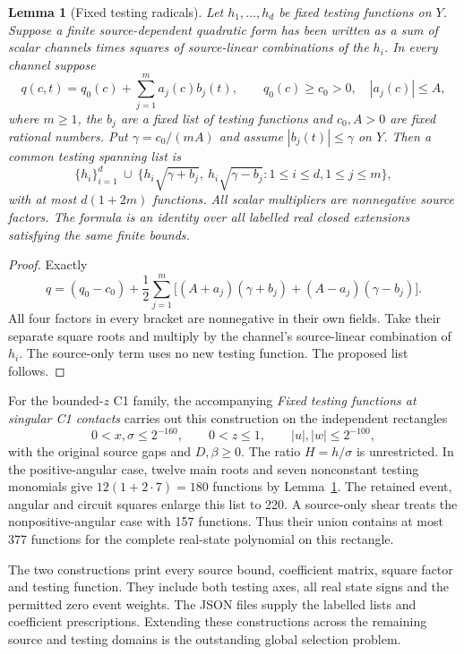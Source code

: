 \documentclass[11pt]{article}
\newtheorem{lemma}[proposition]{Lemma}
\begin{document}
\begin{lemma}[Fixed testing radicals]\label{lem:box}
Let $h_1,\ldots,h_d$ be fixed testing functions on $Y$.
Suppose a finite source-dependent quadratic form has been written
as a sum of scalar channels times squares of source-linear
combinations of the $h_i$. In every channel suppose
\[
 q(c,t)=q_0(c)+\sum_{j=1}^{m}a_j(c)b_j(t),\qquad
 q_0(c)\ge c_0>0,\quad |a_j(c)|\le A,
\]
where $m\ge1$, the $b_j$ are a fixed list of testing functions and
$c_0,A>0$ are fixed rational numbers. Put
$\gamma=c_0/(mA)$ and assume $|b_j(t)|\le\gamma$ on $Y$.
Then a common testing spanning list is
\[
 \{h_i\}_{i=1}^d\ \cup\
 \{h_i\sqrt{\gamma+b_j},\ h_i\sqrt{\gamma-b_j}:
                     1\le i\le d, 1\le j\le m\},
\]
with at most $d(1+2m)$ functions. All scalar multipliers are
nonnegative source factors. The formula is an identity over all
labelled real closed extensions satisfying the same finite bounds.
\end{lemma}
\begin{proof}
Exactly
\[
 q=(q_0-c_0)+\frac12\sum_{j=1}^{m}
 \bigl[(A+a_j)(\gamma+b_j)+(A-a_j)(\gamma-b_j)\bigr].
\]
All four factors in every bracket are nonnegative in their own
fields. Take their separate square roots and multiply by the
channel's source-linear combination of $h_i$. The source-only
term uses no new testing function. The proposed list follows.
\end{proof}

For the bounded-$z$ C1 family, the accompanying
\emph{Fixed testing functions at singular C1 contacts} carries out this
construction on the independent rectangles
\[
0<x,\sigma\le2^{-160},\qquad 0<z\le1,
\qquad |u|,|w|\le2^{-100},
\]
with the original source gaps and $D,\beta\ge0$. The ratio
$H=h/\sigma$ is unrestricted. In the positive-angular case, twelve
main roots and seven nonconstant testing monomials give
$12(1+2\cdot7)=180$ functions by Lemma~\ref{lem:box}.
The retained event, angular and circuit squares enlarge this list
to 220. A source-only shear treats the nonpositive-angular case
with 157 functions. Thus their union contains at most 377 functions
for the complete real-state polynomial on this rectangle.

The two constructions print every source bound, coefficient matrix,
square factor and testing function. They include both testing axes,
all real state signs and the permitted zero event weights.
The JSON files supply the labelled lists and coefficient prescriptions.
Extending these constructions across the remaining source and testing
domains is the outstanding global selection problem.
\end{document}
